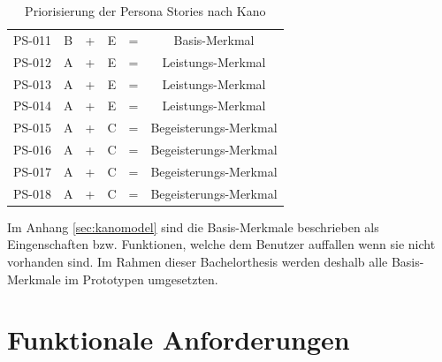 \begin{table}[h!]
\begin{tabular}{cccccc}
PS-011        & B                                                             & + & E                                                                & = & Basis-Merkmal         \\
PS-012        & A                                                             & + & E                                                                & = & Leistungs-Merkmal     \\
PS-013        & A                                                             & + & E                                                                & = & Leistungs-Merkmal     \\
PS-014        & A                                                             & + & E                                                                & = & Leistungs-Merkmal     \\
PS-015        & A                                                             & + & C                                                                & = & Begeisterungs-Merkmal \\
PS-016        & A                                                             & + & C                                                                & = & Begeisterungs-Merkmal \\
PS-017        & A                                                             & + & C                                                                & = & Begeisterungs-Merkmal \\
PS-018        & A                                                             & + & C                                                                & = & Begeisterungs-Merkmal
\end{tabular}
\caption{Priorisierung der Persona Stories nach Kano}
\end{table}

Im Anhang \ref{sec:kanomodel} sind die Basis-Merkmale beschrieben als Eingenschaften bzw. Funktionen, welche dem Benutzer auffallen wenn sie nicht vorhanden sind. Im Rahmen dieser Bachelorthesis werden deshalb alle Basis-Merkmale im Prototypen umgesetzten.

\newpage{}
\section{Funktionale Anforderungen}
\label{sec:funktionaleanforderungen}

\begin{usecase}
\end{usecase}

